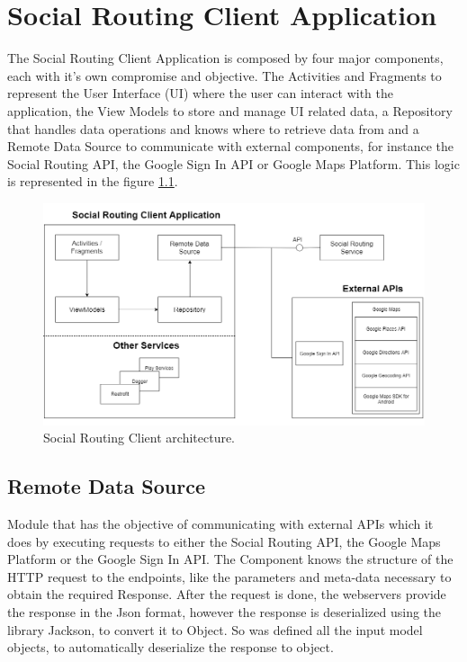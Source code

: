 \chapter{Social Routing Client Application}
The Social Routing Client Application is composed by four major components, each with it's own compromise and objective.
The Activities\cite{activities} and Fragments\cite{fragments} to represent the User Interface (UI) where the user can interact with the application, the 
View Models\cite{viewmodel} to store and manage UI related data, a Repository that handles data operations and knows where to retrieve data from and a 
Remote Data Source to communicate with external components, for instance the Social Routing API, the Google Sign In API\cite{googlesignindocs} or Google Maps Platform. 
This logic is represented in the figure \ref{fig:clientarchitecture}.

\begin{figure}[h]            
        \includegraphics[width=\textwidth]{images/project-structure/social-routing-client-application-structure.PNG}
        \caption{Social Routing Client architecture.}
        \label{fig:clientarchitecture}
\end{figure}
\newpage

\section*{Remote Data Source}
Module that has the objective of communicating with external APIs which it does by executing requests to either the Social Routing API, the Google Maps Platform or the Google Sign In API. 
The Component knows the structure of the HTTP request to the endpoints, like the parameters and meta-data necessary to obtain the required Response. After the request is done, the webservers\cite{webserver} 
provide the response in the Json\cite{jsonwebsite} format, however the response is deserialized using the library Jackson\cite{jackson}, to convert it to Object. 
So was defined all the input model objects, to automatically deserialize the response to object.\\

